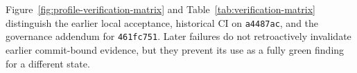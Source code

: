 Figure~\ref{fig:profile-verification-matrix} and
Table~\ref{tab:verification-matrix} distinguish the earlier local acceptance,
historical CI on \texttt{a4487ac}, and the governance addendum for
\texttt{461fc751}. Later failures do not retroactively invalidate earlier
commit-bound evidence, but they prevent its use as a fully green finding for a
different state.



